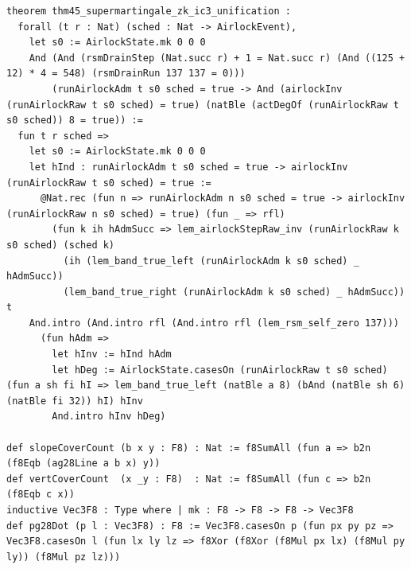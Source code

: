 \documentclass[11pt,letterpaper]{article}
\theoremstyle{spectralthm}
\begin{document}
\begin{lstlisting}[language=Lean4,caption={Standalone Pure Init.Prelude Term-Mode Lean 4 Kernel Suite (thm30--thm61, v0.0.0, 0 sorry, 0 axioms).},label={lst:lean_unified}]
theorem thm45_supermartingale_zk_ic3_unification :
  forall (t r : Nat) (sched : Nat -> AirlockEvent),
    let s0 := AirlockState.mk 0 0 0
    And (And (rsmDrainStep (Nat.succ r) + 1 = Nat.succ r) (And ((125 + 12) * 4 = 548) (rsmDrainRun 137 137 = 0)))
        (runAirlockAdm t s0 sched = true -> And (airlockInv (runAirlockRaw t s0 sched) = true) (natBle (actDegOf (runAirlockRaw t s0 sched)) 8 = true)) :=
  fun t r sched =>
    let s0 := AirlockState.mk 0 0 0
    let hInd : runAirlockAdm t s0 sched = true -> airlockInv (runAirlockRaw t s0 sched) = true :=
      @Nat.rec (fun n => runAirlockAdm n s0 sched = true -> airlockInv (runAirlockRaw n s0 sched) = true) (fun _ => rfl)
        (fun k ih hAdmSucc => lem_airlockStepRaw_inv (runAirlockRaw k s0 sched) (sched k)
          (ih (lem_band_true_left (runAirlockAdm k s0 sched) _ hAdmSucc))
          (lem_band_true_right (runAirlockAdm k s0 sched) _ hAdmSucc)) t
    And.intro (And.intro rfl (And.intro rfl (lem_rsm_self_zero 137)))
      (fun hAdm =>
        let hInv := hInd hAdm
        let hDeg := AirlockState.casesOn (runAirlockRaw t s0 sched) (fun a sh fi hI => lem_band_true_left (natBle a 8) (bAnd (natBle sh 6) (natBle fi 32)) hI) hInv
        And.intro hInv hDeg)

def slopeCoverCount (b x y : F8) : Nat := f8SumAll (fun a => b2n (f8Eqb (ag28Line a b x) y))
def vertCoverCount  (x _y : F8)  : Nat := f8SumAll (fun c => b2n (f8Eqb c x))
inductive Vec3F8 : Type where | mk : F8 -> F8 -> F8 -> Vec3F8
def pg28Dot (p l : Vec3F8) : F8 := Vec3F8.casesOn p (fun px py pz => Vec3F8.casesOn l (fun lx ly lz => f8Xor (f8Xor (f8Mul px lx) (f8Mul py ly)) (f8Mul pz lz)))


\end{lstlisting}
\end{document}
